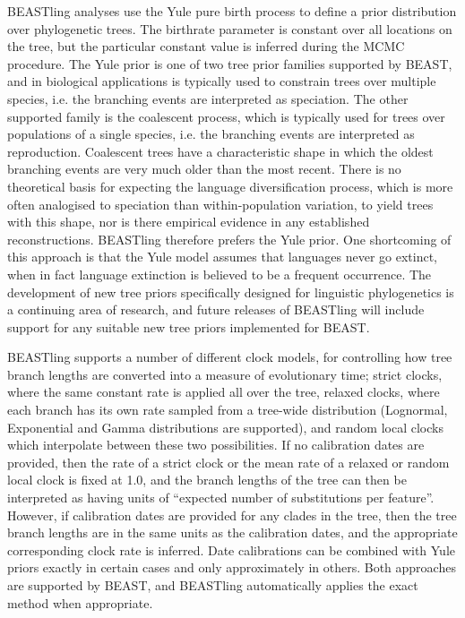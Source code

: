 \documentclass[twocolumn,10pt]{scrartcl}
\begin{document}
BEASTling analyses use the Yule pure birth process\cite{Yule1924} to define a prior distribution over phylogenetic trees.  The birthrate parameter is constant over all locations on the tree, but the particular constant value is inferred during the MCMC procedure.  The Yule prior is one of two tree prior families supported by BEAST, and in biological applications is typically used to constrain trees over multiple species, i.e. the branching events are interpreted as speciation.  The other supported family is the coalescent process\cite{Kingman1982}, which is typically used for trees over populations of a single species, i.e. the branching events are interpreted as reproduction.  Coalescent trees have a characteristic shape in which the oldest branching events are very much older than the most recent.  There is no theoretical basis for expecting the language diversification process, which is more often analogised to speciation than within-population variation, to yield trees with this shape, nor is there empirical evidence in any established reconstructions.  BEASTling therefore prefers the Yule prior.  One shortcoming of this approach is that the Yule model assumes that languages never go extinct, when in fact language extinction is believed to be a frequent occurrence.  The development of new tree priors specifically designed for linguistic phylogenetics is a continuing area of research, and future releases of BEASTling will include support for any suitable new tree priors implemented for BEAST.

BEASTling supports a number of different clock models, for controlling how tree branch lengths are converted into a measure of evolutionary time; strict clocks, where the same constant rate is applied all over the tree, relaxed clocks\cite{Drummond2006}, where each branch has its own rate sampled from a tree-wide distribution (Lognormal, Exponential and Gamma distributions are supported), and random local clocks\cite{Drummond2010} which interpolate between these two possibilities.  If no calibration dates are provided, then the rate of a strict clock or the mean rate of a relaxed or random local clock is fixed at 1.0, and the branch lengths of the tree can then be interpreted as having units of ``expected number of substitutions per feature''.  However, if calibration dates are provided for any clades in the tree, then the tree branch lengths are in the same units as the calibration dates, and the appropriate corresponding clock rate is inferred.  Date calibrations can be combined with Yule priors exactly in certain cases\cite{Heled2011} and only approximately in others.  Both approaches are supported by BEAST, and BEASTling automatically applies the exact method when appropriate.
\end{document}
